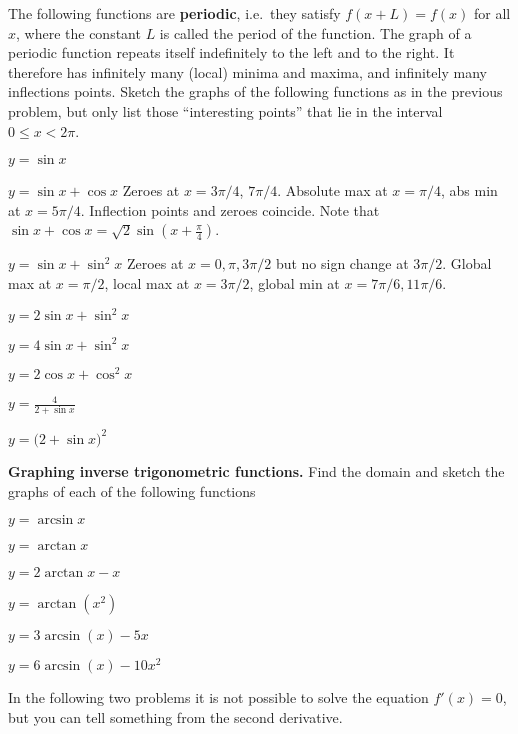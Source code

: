 \begin{multicols}{2}
\bigskip
\noindent%
The following functions are \textbf{periodic}, i.e.\ they satisfy $f(x+L)=f(x)$ for
all $x$, where the constant $L$ is called the period of the function.  The
graph of a periodic function repeats itself indefinitely to the left and to
the right.  It therefore has infinitely many (local) minima and maxima, and
infinitely many inflections points.  Sketch the graphs of the following
functions as in the previous problem, but only list those ``interesting
points'' that lie in the interval $0\leq x<2\pi$.

\problem $\displaystyle y=\sin x$

\problem $\displaystyle y=\sin x+\cos x$
\answer
Zeroes at $x=3\pi/4$, $7\pi/4$. Absolute max at $x=\pi/4$, abs min at
$x=5\pi/4$.  Inflection points and zeroes coincide.  Note that
$\sin x+\cos x = \sqrt2 \sin(x+\frac\pi4)$.
\endanswer

\problem $\displaystyle y=\sin x +\sin^2 x$
\answer
Zeroes at $x=0, \pi, 3\pi/2$ but no sign change at $3\pi/2$.  Global
max at $x=\pi/2$, local max at $x=3\pi/2$, global min at $x=7\pi/6,
11\pi/6$.
\endanswer

\problem $\displaystyle y=2\sin x+\sin^2x$

\problem $\displaystyle y=4\sin x +\sin^2 x$

\problem $\displaystyle y=2\cos x+\cos^2x$

\problem $\displaystyle y=\frac4{2+\sin x}$

\problem $\displaystyle y=\bigl(2+\sin x\bigr)^2$



\bigskip


\textbf{Graphing inverse trigonometric functions. }
Find the domain and sketch the graphs of each of the following functions

\problem $\displaystyle y=\arcsin x$

\problem $\displaystyle y=\arctan x$

\problem $\displaystyle y=2\arctan x-x$

\problem $\displaystyle y=\arctan(x^2)$

\problem $\displaystyle y=3\arcsin(x) - 5x $

\problem $\displaystyle y=6\arcsin (x) - 10x^2$



\bigskip


\problem In the following two problems it is not possible to solve
the equation $f'(x)=0$, but you can tell something from the second
derivative.


\end{multicols}
